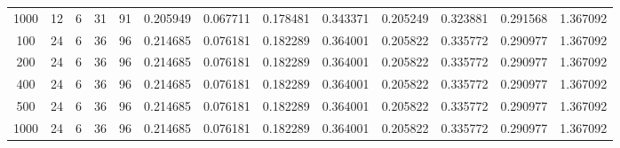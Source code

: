 \begin{table}[h]
\begin{tabular}{ccccccccccccc}
1000 & 12 & 6 & 31 & 91 & 0.205949 & 0.067711 & 0.178481 & 0.343371 & 0.205249 & 0.323881 & 0.291568 & 1.367092 \\
100 & 24 & 6 & 36 & 96 & 0.214685 & 0.076181 & 0.182289 & 0.364001 & 0.205822 & 0.335772 & 0.290977 & 1.367092 \\
200 & 24 & 6 & 36 & 96 & 0.214685 & 0.076181 & 0.182289 & 0.364001 & 0.205822 & 0.335772 & 0.290977 & 1.367092 \\
400 & 24 & 6 & 36 & 96 & 0.214685 & 0.076181 & 0.182289 & 0.364001 & 0.205822 & 0.335772 & 0.290977 & 1.367092 \\
500 & 24 & 6 & 36 & 96 & 0.214685 & 0.076181 & 0.182289 & 0.364001 & 0.205822 & 0.335772 & 0.290977 & 1.367092 \\
1000 & 24 & 6 & 36 & 96 & 0.214685 & 0.076181 & 0.182289 & 0.364001 & 0.205822 & 0.335772 & 0.290977 & 1.367092 \\
\bottomrule
\end{tabular}
\end{table}
